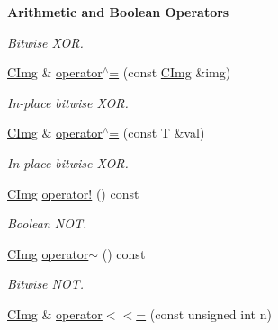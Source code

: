 \begin{Indent}{\bf Arithmetic and Boolean Operators}
\begin{DoxyCompactItemize}
\begin{DoxyCompactList}\small\item\em Bitwise XOR. \item\end{DoxyCompactList}\item 
\hypertarget{structcimg__library_1_1_c_img_a50aff90f67a68a122c8ba56895d030d7}{
\hyperlink{structcimg__library_1_1_c_img}{CImg} \& \hyperlink{structcimg__library_1_1_c_img_a50aff90f67a68a122c8ba56895d030d7}{operator$^\wedge$=} (const \hyperlink{structcimg__library_1_1_c_img}{CImg} \&img)}
\label{structcimg__library_1_1_c_img_a50aff90f67a68a122c8ba56895d030d7}

\begin{DoxyCompactList}\small\item\em In-\/place bitwise XOR. \item\end{DoxyCompactList}\item 
\hypertarget{structcimg__library_1_1_c_img_a76474dd94d34621417cf7fae5acc3d28}{
\hyperlink{structcimg__library_1_1_c_img}{CImg} \& \hyperlink{structcimg__library_1_1_c_img_a76474dd94d34621417cf7fae5acc3d28}{operator$^\wedge$=} (const T \&val)}
\label{structcimg__library_1_1_c_img_a76474dd94d34621417cf7fae5acc3d28}

\begin{DoxyCompactList}\small\item\em In-\/place bitwise XOR. \item\end{DoxyCompactList}\item 
\hypertarget{structcimg__library_1_1_c_img_abdbaf66d7a237258a71ea68a5ed5b9f9}{
\hyperlink{structcimg__library_1_1_c_img}{CImg} \hyperlink{structcimg__library_1_1_c_img_abdbaf66d7a237258a71ea68a5ed5b9f9}{operator!} () const }
\label{structcimg__library_1_1_c_img_abdbaf66d7a237258a71ea68a5ed5b9f9}

\begin{DoxyCompactList}\small\item\em Boolean NOT. \item\end{DoxyCompactList}\item 
\hypertarget{structcimg__library_1_1_c_img_af4801dff82c4ebdb6bed81846f8536c7}{
\hyperlink{structcimg__library_1_1_c_img}{CImg} \hyperlink{structcimg__library_1_1_c_img_af4801dff82c4ebdb6bed81846f8536c7}{operator$\sim$} () const }
\label{structcimg__library_1_1_c_img_af4801dff82c4ebdb6bed81846f8536c7}

\begin{DoxyCompactList}\small\item\em Bitwise NOT. \item\end{DoxyCompactList}\item 
\hypertarget{structcimg__library_1_1_c_img_ad66d92a01ce306cff329b7ed6f7e47ac}{
\hyperlink{structcimg__library_1_1_c_img}{CImg} \& \hyperlink{structcimg__library_1_1_c_img_ad66d92a01ce306cff329b7ed6f7e47ac}{operator$<$$<$=} (const unsigned int n)}
\label{structcimg__library_1_1_c_img_ad66d92a01ce306cff329b7ed6f7e47ac}


\end{DoxyCompactItemize}
\end{Indent}
